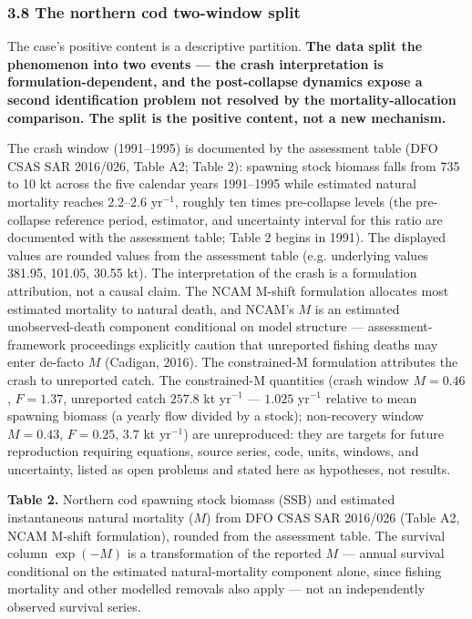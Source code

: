 \documentclass[11pt]{article}
\begin{document}
\subsubsection{3.8 The northern cod two-window
split}\label{the-northern-cod-two-window-split}

The case's positive content is a descriptive partition. \textbf{The
data split the phenomenon into two events --- the crash
interpretation is formulation-dependent, and the post-collapse dynamics
expose a second identification problem not resolved by the
mortality-allocation comparison. The split is the positive content, not
a new mechanism.}

The crash window (1991--1995) is documented by the assessment table (DFO
CSAS SAR 2016/026, Table A2; Table 2): spawning stock biomass falls from
735 to 10 kt across the five calendar years 1991--1995 while estimated
natural mortality reaches 2.2--2.6 yr\(^{-1}\), roughly ten times
pre-collapse levels (the pre-collapse reference period, estimator, and
uncertainty interval for this ratio are documented with the assessment
table; Table 2 begins in 1991). The displayed values are
rounded values from the assessment table (e.g. underlying values 381.95, 101.05, 30.55 kt). The
interpretation of the crash is a formulation attribution, not a causal
claim. The NCAM M-shift formulation allocates most estimated mortality
to natural death, and NCAM's \(M\) is an estimated unobserved-death
component conditional on model structure --- assessment-framework
proceedings explicitly caution that unreported fishing deaths may enter
de-facto \(M\) (Cadigan, 2016). The constrained-M formulation attributes
the crash to unreported catch. The constrained-M quantities (crash
window \(M=0.46\), \(F=1.37\), unreported catch \(257.8\) kt yr\(^{-1}\)
--- \(1.025\) yr\(^{-1}\) relative to mean spawning biomass (a yearly
flow divided by a stock); non-recovery window \(M=0.43\), \(F=0.25\),
\(3.7\) kt yr\(^{-1}\)) are unreproduced: they are targets for future reproduction
requiring equations, source series, code, units, windows, and
uncertainty, listed as open problems and stated here as
hypotheses, not results.

\textbf{Table 2.} Northern cod spawning stock biomass (SSB) and
estimated instantaneous natural mortality (\(M\)) from DFO CSAS SAR
2016/026 (Table A2, NCAM M-shift formulation), rounded from the
assessment table. The survival column \(\exp(-M)\) is a transformation
of the reported \(M\) --- annual survival conditional on the estimated
natural-mortality component alone, since fishing mortality and other
modelled removals also apply --- not an independently observed survival
series.
\end{document}
